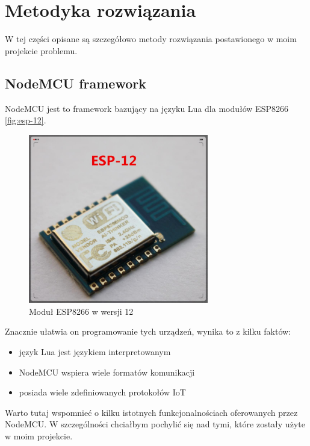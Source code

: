 \section{Metodyka rozwiązania}
\label{sec:metodyka-rozwiazania}
W tej części opisane są szczegółowo metody rozwiązania postawionego w moim projekcie problemu.

\subsection{NodeMCU framework}
NodeMCU jest to framework bazujący na języku Lua dla modułów ESP8266 \autoref{fig:esp-12}.
\begin{figure}[!htbp]
	\centering
	\includegraphics[width=0.7\textwidth]{images/esp-12.jpg}
	\caption[Moduł ESP8266 w wersji 12.]{Moduł ESP8266 w wersji 12} 
	\label{fig:esp-12}
\end{figure}
Znacznie ułatwia on programowanie tych urządzeń, wynika to z kilku faktów:
\begin{itemize}
	\item język Lua jest językiem interpretowanym 
	\item NodeMCU wspiera wiele formatów komunikacji  
	\item posiada wiele zdefiniowanych protokołów IoT
\end{itemize}
Warto tutaj wspomnieć o kilku istotnych funkcjonalnościach oferowanych przez NodeMCU. W szczególności chciałbym pochylić się nad tymi, które zostały użyte w moim projekcie. 


